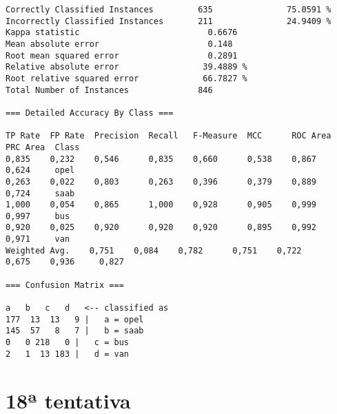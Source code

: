 \documentclass[
	article,			%
	11pt,				%
	oneside,			%
	a4paper,			%
	english,			%
	brazil,				%
	sumario=tradicional
	]{abntex2}
\begin{document}
\begin{lstlisting}
Correctly Classified Instances         635               75.0591 %
Incorrectly Classified Instances       211               24.9409 %
Kappa statistic                          0.6676
Mean absolute error                      0.148 
Root mean squared error                  0.2891
Relative absolute error                 39.4889 %
Root relative squared error             66.7827 %
Total Number of Instances              846     

=== Detailed Accuracy By Class ===

TP Rate  FP Rate  Precision  Recall   F-Measure  MCC      ROC Area  PRC Area  Class
0,835    0,232    0,546      0,835    0,660      0,538    0,867     0,624     opel
0,263    0,022    0,803      0,263    0,396      0,379    0,889     0,724     saab
1,000    0,054    0,865      1,000    0,928      0,905    0,999     0,997     bus
0,920    0,025    0,920      0,920    0,920      0,895    0,992     0,971     van
Weighted Avg.    0,751    0,084    0,782      0,751    0,722      0,675    0,936     0,827     

=== Confusion Matrix ===

a   b   c   d   <-- classified as
177  13  13   9 |   a = opel
145  57   8   7 |   b = saab
0   0 218   0 |   c = bus
2   1  13 183 |   d = van

\end{lstlisting}

\newpage

\section{18ª tentativa}
\end{document}
